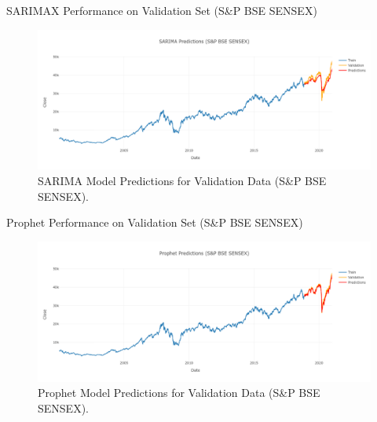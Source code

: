 \documentclass{beamer}
\begin{document}
\begin{frame}{SARIMAX Performance on Validation Set (S\&P BSE SENSEX)}
	\begin{figure}
		\centering
		\includegraphics[width = \textwidth]{images/SARIMA-SENSEX-Predictions.png}
		\caption{SARIMA Model Predictions for Validation Data (S\&P BSE SENSEX).}
		\label{fig:my_label}
	\end{figure}
\end{frame}

\begin{frame}{Prophet Performance on Validation Set (S\&P BSE SENSEX)}
	\begin{figure}
		\centering
		\includegraphics[width = \textwidth]{images/Prophet-SENSEX-Predictions.png}
		\caption{Prophet Model Predictions for Validation Data (S\&P BSE SENSEX).}
		\label{fig:my_label}
	\end{figure}
\end{frame}
\end{document}
